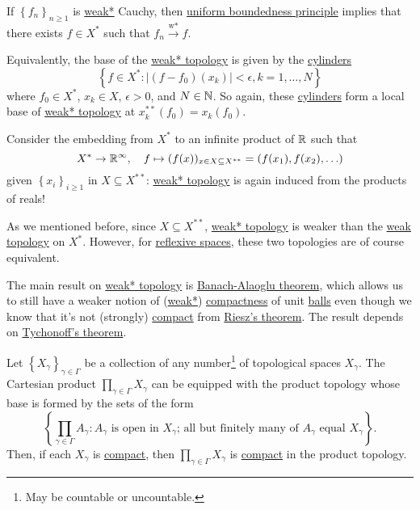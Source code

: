\begin{note}[Completeness]
	If \(\left\{ f_n \right\}_{n \geq 1}\) is \hyperref[def:weak*-convergence]{weak*} Cauchy, then \hyperref[thm:uniform-boundedness]{uniform boundedness principle} implies that there exists \(f\in X^{\ast} \) such that \(f_n \overset{\text{w*}}{\to } f\).
\end{note}

Equivalently, the base of the \hyperref[def:weak*-topology]{weak* topology} is given by the \href{https://en.wikipedia.org/wiki/Cylinder_set}{cylinders}
\[
	\left\{ f\in X^{\ast} \colon \left\vert (f-f_0)(x_k) \right\vert < \epsilon , k = 1, \ldots , N \right\}
\]
where \(f_0\in X^{\ast} \), \(x_k\in X\), \(\epsilon > 0\), and \(N\in \mathbb{\MakeUppercase{n}} \). So again, these \href{https://en.wikipedia.org/wiki/Cylinder_set}{cylinders} form a local base of \hyperref[def:weak*-topology]{weak* topology} at \(x^{\ast\ast}_k(f_0) = x_k(f_0)\).

\begin{remark}
	Consider the embedding from \(X^{\ast} \) to an infinite product of \(\mathbb{\MakeUppercase{r}} \) such that
	\[
		X^{\ast} \to \mathbb{\MakeUppercase{r}} ^{\infty },\quad f\mapsto (f(x))_{x\in X \subseteq X^{\ast\ast}} = (f(x_1), f(x_2), \ldots )
	\]
	given \(\left\{ x_i \right\} _{i\geq 1}\) in \(X \subseteq X^{\ast\ast} \): \hyperref[def:weak*-topology]{weak* topology} is again induced from the products of reals!
\end{remark}

As we mentioned before, since \(X \subseteq X^{\ast\ast}\), \hyperref[def:weak*-topology]{weak* topology} is weaker than the \hyperref[def:weak-topology]{weak topology} on \(X^{\ast} \). However, for \hyperref[def:reflexive-space]{reflexive spaces}, these two topologies are of course equivalent.

The main result on \hyperref[def:weak*-topology]{weak* topology} is \hyperref[thm:Banach-Alaoglu]{Banach-Alaoglu theorem}, which allows us to still have a weaker notion of (\hyperref[def:weak*-topology]{weak*}) \hyperref[def:compact]{compactness} of unit \hyperref[def:ball]{balls} even though we know that it's not (strongly) \hyperref[def:compact]{compact} from \hyperref[thm:Riesz]{Riesz's theorem}. The result depends on \hyperref[thm:Tychonoff]{Tychonoff's theorem}.

\begin{theorem}\label{thm:Tychonoff}
	Let \(\left\{ X_\gamma\right\}_{\gamma \in \Gamma}\) be a collection of any number\footnote{May be countable or uncountable.} of topological spaces \(X_\gamma \). The Cartesian product \(\prod_{\gamma \in \Gamma } X_\gamma \) can be equipped with the product topology whose base is formed by the sets of the form
	\[
		\left\{ \prod_{\gamma \in \Gamma } A_\gamma \colon \text{\(A_\gamma\) is open in \(X_\gamma\); all but finitely many of \(A_\gamma\) equal \(X_\gamma\)}\right\}.
	\]
	Then, if each \(X_\gamma \) is \hyperref[def:compact]{compact}, then \(\prod_{\gamma \in \Gamma }X_\gamma \) is \hyperref[def:compact]{compact} in the product topology.
\end{theorem}


